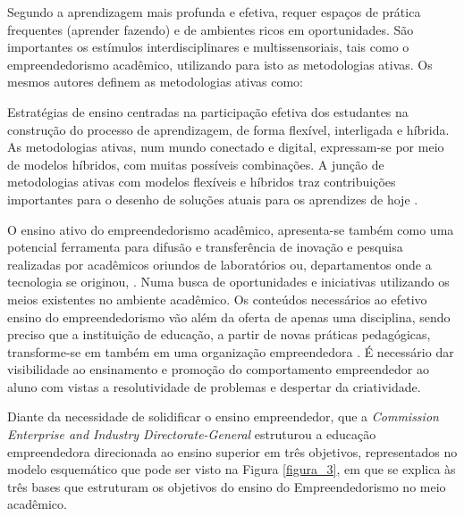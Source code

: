 Segundo  a aprendizagem mais profunda e efetiva, requer espaços de prática frequentes (aprender fazendo) e de ambientes ricos em oportunidades.  São importantes os estímulos interdisciplinares e multissensoriais, tais como o empreendedorismo acadêmico, utilizando para isto as metodologias ativas. Os mesmos autores definem as metodologias ativas como:

\begin{citacao}
Estratégias de ensino centradas na participação efetiva dos estudantes na construção do processo de aprendizagem, de forma flexível, interligada e híbrida. As metodologias ativas, num mundo conectado e digital, expressam-se por meio de modelos híbridos, com muitas possíveis combinações. A junção de metodologias ativas com modelos flexíveis e híbridos traz contribuições importantes para o desenho de soluções atuais para os aprendizes de hoje \cite{bacich_metodologias_2018}.
\end{citacao}

O ensino ativo do empreendedorismo acadêmico, apresenta-se também como uma potencial ferramenta para difusão e transferência de inovação e pesquisa realizadas por acadêmicos oriundos de laboratórios ou, departamentos onde a tecnologia se originou, \cite{guo_what_2019, abreu_nature_2013}. Numa busca de oportunidades e iniciativas utilizando os meios existentes no ambiente acadêmico. Os conteúdos necessários ao efetivo ensino do empreendedorismo vão além da oferta de apenas uma disciplina, sendo preciso que a instituição de educação, a partir de novas práticas pedagógicas, transforme-se em também em uma organização empreendedora \cite{campelli_empreendedorismo_2011}. É necessário dar visibilidade ao ensinamento e promoção do comportamento empreendedor ao aluno com vistas a resolutividade de problemas \cite{degen_o_1989} e despertar da criatividade.

Diante da necessidade de solidificar o ensino empreendedor, que a \textit{Commission Enterprise and Industry Directorate-General} \cite{european_commission_best_2008} estruturou a educação empreendedora direcionada ao ensino superior em três objetivos, representados no modelo esquemático que pode ser visto na Figura \ref{figura_3}, em que se explica às três bases que estruturam os objetivos do ensino do Empreendedorismo no meio acadêmico. 


